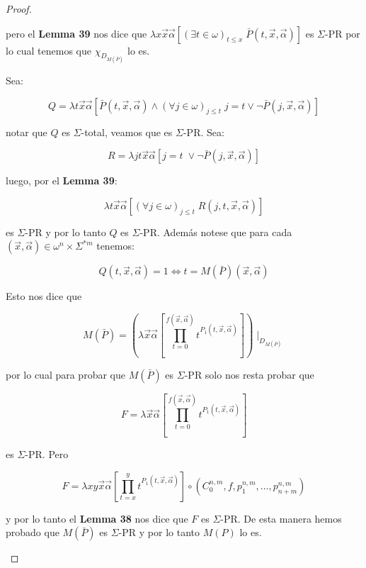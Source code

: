 \begin{proof}
\begin{enumerate}[a)]
        \PN pero el \textbf{Lemma 39} nos dice que $\lambda x\vec{x}\vec{\alpha} \left[(\exists t \in \omega)_{t\leq x}
        \; \bar{P}(t,\vec{x},\vec{\alpha})\right]$ es $\Sigma$-PR por lo cual tenemos que $\chi_{D_{M(\bar{P})}}$ lo es.

        \PN Sea:

        \[
          Q = \lambda t\vec{x}\vec{\alpha}\left[\bar{P}(t,\vec{x},\vec{\alpha}) \wedge (\forall j \in \omega)_{j \leq t}
          \; j=t \vee \lnot \bar{P}(j,\vec{x},\vec{\alpha})\right]
        \]

        \PN notar que $Q$ es $\Sigma$-total, veamos que es $\Sigma$-PR. Sea:

        \[
          R = \lambda jt\vec{x}\vec{\alpha} \left[j=t \; \vee \neg \bar{P}(j,\vec{x},\vec{\alpha})\right]
        \]

        \PN luego, por el \textbf{Lemma 39}:

        \[
          \lambda t\vec{x}\vec{\alpha} \left[(\forall j \in \omega)_{j \leq t} \; R(j,t,\vec{x},\vec{\alpha})\right]
        \]

        \PN es $\Sigma$-PR y por lo tanto $Q$ es $\Sigma$-PR. Además notese que para cada $(\vec{x},\vec{\alpha}) \in
        \omega^{n} \times \Sigma^{\ast m}$ tenemos:

        \[
          Q(t,\vec{x},\vec{\alpha}) = 1 \Leftrightarrow t = M(\bar{P})(\vec{x},\vec{\alpha})
        \]

        \PN Esto nos dice que

        \[
          M(\bar{P}) = \left(\lambda \vec{x}\vec{\alpha}\left[\prod_{t=0}^{f(\vec{x},\vec{\alpha})}t^{P_{1}(t,\vec{x},
          \vec{\alpha})}\right]\right) \mid_{D_{M(\bar{P})}}
        \]

        \PN por lo cual para probar que $M(\bar{P})$ es $\Sigma$-PR solo nos resta probar que

        \[
          F = \lambda \vec{x}\vec{\alpha}\left[\prod_{t=0}^{f(\vec{x},\vec{\alpha})}t^{P_{1}(t,\vec{x},\vec{\alpha})}
          \right]
        \]

        \PN es $\Sigma$-PR. Pero

        \[
          F = \lambda xy\vec{x}\vec{\alpha}\left[\prod_{t=x}^{y}t^{P_{1}(t,\vec{x},\vec{\alpha})}\right] \circ
          (C_{0}^{n,m},f,p_{1}^{n,m},\dotsc,p_{n+m}^{n,m})
        \]

        \PN y por lo tanto el \textbf{Lemma 38} nos dice que $F$ es $\Sigma$-PR. De esta manera hemos probado que
        $M(\bar{P})$ es $\Sigma$-PR y por lo tanto $M(P)$ lo es.
    \end{enumerate}
  \end{proof}

